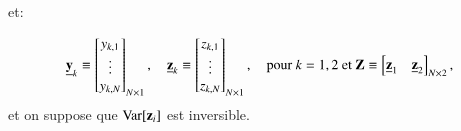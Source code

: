 et:

\[
    \underline{{\mathbf y}}_k \equiv 
    \begin{bmatrix}
        y_{k,1}\\
        \vdots\\
        y_{k, N}
    \end{bmatrix}_{N\times 1}
    , \quad 
    \underline{{\mathbf z}}_k \equiv
        \begin{bmatrix}
        z_{k,1}\\
        \vdots\\
        z_{k, N}
    \end{bmatrix}_{N\times 1}
    , \quad \text{pour $k=1, 2$ et} \
    \mathbf Z \equiv 
\begin{bmatrix}
    \underline{{\mathbf z}}_1& \underline{{\mathbf z}}_2
\end{bmatrix}_{N\times 2},
\]
et on suppose que $\operatorname{Var}[{\mathbf z}_i]$ est inversible.

